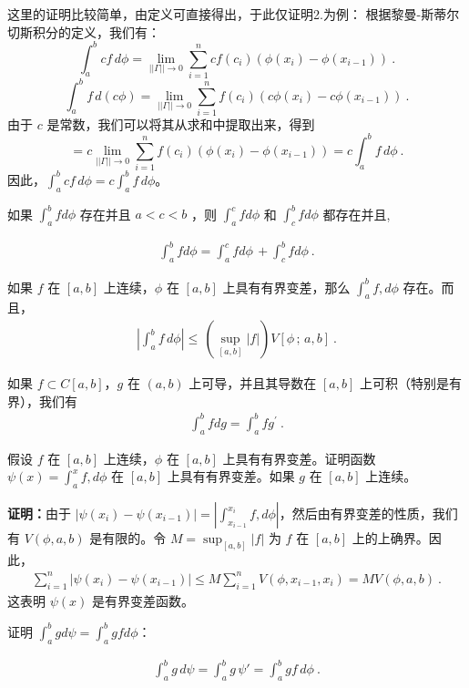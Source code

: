 这里的证明比较简单，由定义可直接得出，于此仅证明2.为例：
根据黎曼-斯蒂尔切斯积分的定义，我们有：
   \[
   \int_{a}^{b}cf\,d\phi = \lim_{||\Gamma|| \to 0} \sum_{i=1}^{n} cf(c_i)(\phi(x_i) - \phi(x_{i-1}))~.
   \]
   \[
   \int_{a}^{b}f\,d(c\phi) = \lim_{||\Gamma|| \to 0} \sum_{i=1}^{n} f(c_i)(c\phi(x_i) - c\phi(x_{i-1}))~.
   \]
   由于 $c$ 是常数，我们可以将其从求和中提取出来，得到
\[
   = c\lim_{||\Gamma|| \to 0} \sum_{i=1}^{n} f(c_i)(\phi(x_i) - \phi(x_{i-1})) = c\int_{a}^{b}f\,d\phi~.
   \]
   因此，$\int_{a}^{b}cf\,d\phi=c\int_{a}^{b}f\,d\phi$。

\begin{theorem}{}
如果 $ \int_{a}^{b}fd\phi $ 存在并且 $ a<c<b $ ，则 $ \int_{a}^{c}fd\phi $ 和 $ \int_{c}^{b}fd\phi $ 都存在并且,

\begin{align}
\int_{a}^{b}fd\phi=\int_{a}^{c}fd\phi\,+\int_{c}^{b}fd\phi~.
\end{align}
\end{theorem}



\begin{theorem}{}
如果 $f$ 在 $[a,b]$ 上连续，$\phi$ 在 $[a,b]$ 上具有有界变差，那么 $ \int_{a}^{b}f,d\phi$ 存在。而且，
\begin{align}
  \left|\int_{a}^{b}f\,d\phi\right|\leq\,(\sup_{[a,b]}|f|)V[\phi\,;\,a,b]~.
\end{align}

\end{theorem}

\begin{theorem}{}
如果 $f\subset C[a,b]$，$g$ 在 $(a,b)$ 上可导，并且其导数在 $[a,b]$ 上可积（特别是有界），我们有
\begin{align}
\int_{a}^{b}fdg=\int_{a}^{b}fg^{\prime}~.
\end{align}
\end{theorem}

\begin{example}{假设 $f$ 在 $[a,b]$ 上连续，$\phi$ 在 $[a,b]$ 上具有有界变差。证明函数 $\psi(x)=\int_{a}^{x}f,d\phi$ 在 $[a,b]$ 上具有有界变差。如果 $g$ 在 $[a,b]$ 上连续。}

\textbf{证明：}由于 $ |\psi(x_i) - \psi(x_{i-1})| = \left|\int_{x_{i-1}}^{x_i}f , d\phi\right| $，然后由有界变差的性质，我们有 $ V(\phi, a, b) $ 是有限的。令 $ M = \sup_{[a,b]}|f| $ 为 $ f $ 在 $ [a, b] $ 上的上确界。因此， \begin{align} \sum_{i=1}^n |\psi(x_i) - \psi(x_{i-1})| \leq M \sum_{i=1}^n V(\phi,x_{i-1},x_i) = MV(\phi,a,b)~. \end{align} 这表明 $ \psi(x) $ 是有界变差函数。

证明 $\int_{a}^{b}gd\psi=\int_{a}^{b}gfd\phi$：

\begin{align}
\int_{a}^{b}g\,d\psi=\int_{a}^{b}g\,\psi'=\int_{a}^{b}gf\,d\phi~.
\end{align}
\end{example}

